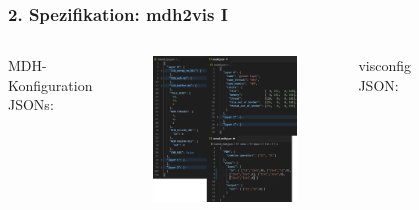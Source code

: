 \documentclass{presentation}
\begin{document}
\begin{frame}
	\frametitle{2. Spezifikation: mdh2vis I}
	\begin{columns}
		MDH-Konfiguration JSONs:
		\begin{figure}
			\includegraphics[width=0.9\linewidth]{images/konfiguration_stencil.png}
		\end{figure}
		visconfig JSON:
		\begin{figure}

\end{figure}
\end{columns}
\end{frame}
\end{document}
